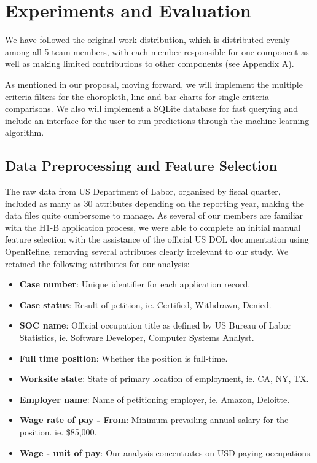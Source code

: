 \documentclass[sigconf]{acmart}
\begin{document}
\section{Experiments and Evaluation}

We have followed the original work distribution, which is distributed evenly among all 5 team members, 
with each member responsible for one component as well as making limited contributions to other components (see Appendix A). 


As mentioned in our proposal, moving forward, we will implement the multiple criteria filters for the choropleth, line and 
bar charts for single criteria comparisons. We also will implement a SQLite database for fast querying 
and include an interface for the user to run predictions through the machine learning algorithm. 


\subsection{Data Preprocessing and Feature Selection}

The raw data from US Department of Labor, organized by fiscal quarter, 
included as many as 30 attributes depending on the reporting year, 
making the data files quite cumbersome to manage. 
As several of our members are familiar with the H1-B application process, 
we were able to complete an initial manual feature selection with the assistance 
of the official US DOL documentation using OpenRefine, 
removing several attributes clearly irrelevant to our study. 
We retained the following attributes for our analysis:

  \begin{itemize}
    
  \item \textbf{Case number}: Unique identifier for each application record.
  \item \textbf{Case status}: Result of petition, 
  ie. Certified, Withdrawn, Denied. 
  \item \textbf{SOC name}: Official occupation title as defined by US Bureau of Labor Statistics, 
  ie. Software Developer, Computer Systems Analyst.
  \item \textbf{Full time position}: Whether the position is full-time.
  \item \textbf{Worksite state}: State of primary location of employment,
  ie. CA, NY, TX.
  \item \textbf{Employer name}: Name of petitioning employer,
  ie. Amazon, Deloitte.
  \item \textbf{Wage rate of pay - From}: Minimum prevailing annual salary for the position.
  ie. \$85,000.
  \item \textbf{Wage - unit of pay}: Our analysis concentrates on USD paying occupations.

  \end{itemize}
\end{document}
